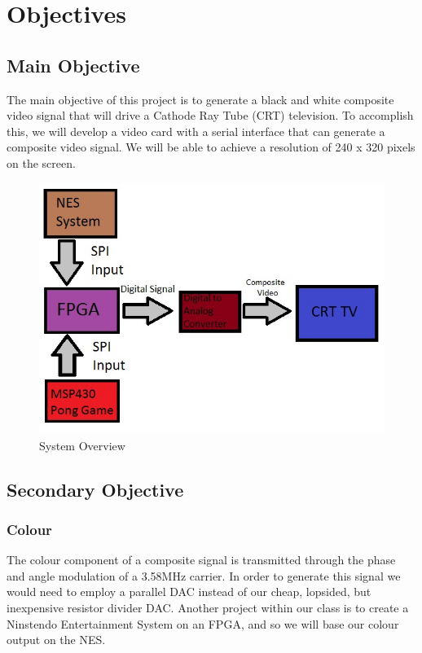 \section{Objectives}

\subsection{Main Objective}

The main objective of this project is to generate a black and white composite
video signal that will drive a Cathode Ray Tube (CRT) television. To accomplish
this, we will develop a video card with a serial interface that can generate a
composite video signal. We will be able to achieve a resolution of 240 x 320
pixels on the screen.

\begin{figure}[H]
   \centering
   \includegraphics[scale=0.5]{Diagram.jpg}
   \caption{System Overview}
\end{figure}

\subsection{Secondary Objective}

\subsubsection{Colour}

The colour component of a composite signal is transmitted through the phase and
angle modulation of a 3.58MHz carrier. In order to generate this signal we would
need to employ a parallel DAC instead of our cheap, lopsided, but inexpensive
resistor divider DAC. Another project within our class is to create a Ninstendo
Entertainment System on an FPGA, and so we will base our colour output on the
NES.

